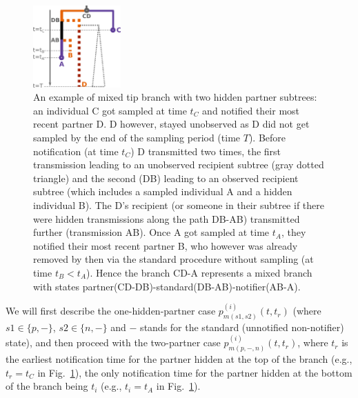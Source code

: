 \documentclass[10pt,letterpaper]{article}
\begin{document}
\begin{figure}[h]
\centering 
\includegraphics[width=0.3\textwidth]{Fig_mixed}
\caption{An example of mixed tip branch with two hidden partner subtrees: an individual C got sampled at time $t_C$ and notified their most recent partner D. D however, stayed unobserved as D did not get sampled by the end of the sampling period (time $T$). Before notification (at time $t_C$) D transmitted two times, the first transmission leading to an unobserved recipient subtree (gray dotted triangle) and the second (DB) leading to an observed recipient subtree (which includes a sampled individual A and a hidden individual B). The D's recipient (or someone in their subtree if there were hidden transmissions along the path DB-AB) transmitted further (transmission AB). Once A got sampled at time $t_A$, they notified their most recent partner B, who however was already removed by then via the standard procedure without sampling (at time $t_B < t_A$). Hence the branch CD-A represents a mixed branch with states partner(CD-DB)-standard(DB-AB)-notifier(AB-A). }
\label{fig:pn-mixed} 
\end{figure}


We will first describe the one-hidden-partner case $p_{m(s1,s2)}^{(i)}(t,t_r)$ (where $s1 \in \{p, -\}$, $s2 \in \{n, -\}$ and $-$ stands for the standard (unnotified non-notifier) state), and then proceed with the two-partner case $p_{m(p,-,n)}^{(i)}(t,t_{r})$, where $t_{r}$ is the earliest notification time for the partner hidden at the top of the branch (e.g., $t_r=t_C$ in Fig.~\ref{fig:pn-mixed}), the only notification time for the partner hidden at the bottom of the branch being $t_i$  (e.g., $t_i=t_A$ in Fig.~\ref{fig:pn-mixed}).
\end{document}
